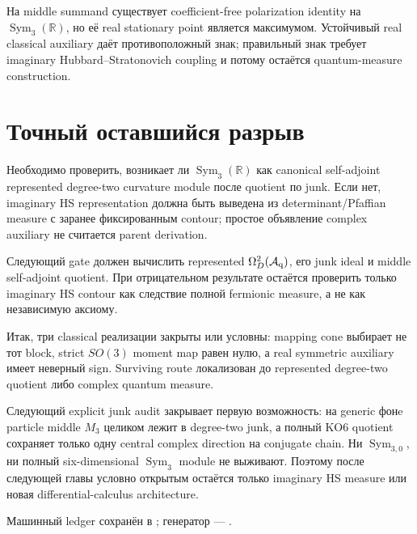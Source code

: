 \begin{theorem}
На middle summand существует coefficient-free polarization identity на
\(\operatorname{Sym}_3(\mathbb R)\), но её real stationary point является
максимумом. Устойчивый real classical auxiliary даёт противоположный знак;
правильный знак требует imaginary Hubbard--Stratonovich coupling и потому
остаётся quantum-measure construction.
\end{theorem}

\section{Точный оставшийся разрыв}

Необходимо проверить, возникает ли
\(\operatorname{Sym}_3(\mathbb R)\) как canonical self-adjoint represented
degree-two curvature module после quotient по junk. Если нет, imaginary
HS representation должна быть выведена из determinant/Pfaffian measure с
заранее фиксированным contour; простое объявление complex auxiliary не
считается parent derivation.

\begin{protocol}
Следующий gate должен вычислить represented
\(\Omega_D^2(\mathcal A_{\rm q})\), его junk ideal и middle self-adjoint
quotient. При отрицательном результате остаётся проверить только imaginary
HS contour как следствие полной fermionic measure, а не как независимую
аксиому.
\end{protocol}

Итак, три classical реализации закрыты или условны: mapping cone выбирает
не тот block, strict \(SO(3)\) moment map равен нулю, а real symmetric
auxiliary имеет неверный sign. Surviving route локализован до represented
degree-two quotient либо complex quantum measure.

Следующий explicit junk audit закрывает первую возможность: на generic
фонe particle middle \(M_3\) целиком лежит в degree-two junk, а полный KO6
quotient сохраняет только одну central complex direction на conjugate
chain. Ни \(\operatorname{Sym}_{3,0}\), ни полный six-dimensional
\(\operatorname{Sym}_3\) module не выживают. Поэтому после следующей главы
условно открытым остаётся только imaginary HS measure или новая
differential-calculus architecture.

Машинный ledger сохранён в
;
генератор ---
.